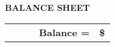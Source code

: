 \documentclass{letter}
\begin{document}
\vspace{1 cm}

\centering\Large\textbf{BALANCE SHEET}\normalsize

\begin{tabularx}{\linewidth}{l X X r r}


    & & & \centering\Large\bf
    Balance =
    & \centering\Large\bf
    \$ %

\end{tabularx}

\vspace{1 cm}
\end{document}

